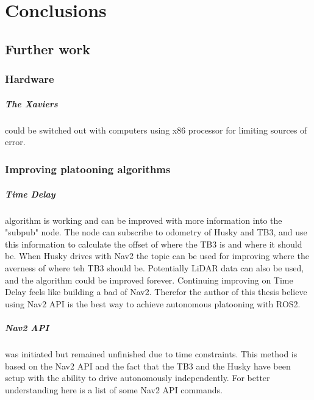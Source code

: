 \chapter{Conclusions}

\section{Further work} \label{Further work}

\subsection{Hardware}
\paragraph{The Xaviers} could be switched out with computers using x86 processor for limiting sources of error. 

\paragraph{}

\subsection{Improving platooning algorithms}
\paragraph{Time Delay} algorithm is working and can be improved with more information into the "subpub" node. The node can subscribe to odometry of Husky and TB3, and use this information to calculate the offset of where the TB3 is and where it should be. When Husky drives with Nav2 the topic  can be used for improving where the averness of where teh TB3 should be. Potentially LiDAR data can also be used, and the algorithm could be improved forever. Continuing improving on Time Delay feels like building a bad of Nav2. Therefor the author of this thesis believe using Nav2 API is the best way to achieve autonomous platooning with ROS2. 

\paragraph{Nav2 API} was initiated but remained unfinished due to time constraints. This method is based on the Nav2 API and the fact that the TB3 and the Husky have been setup with the ability to drive autonomously independently. For better understanding here is a list of some Nav2 API commands.

